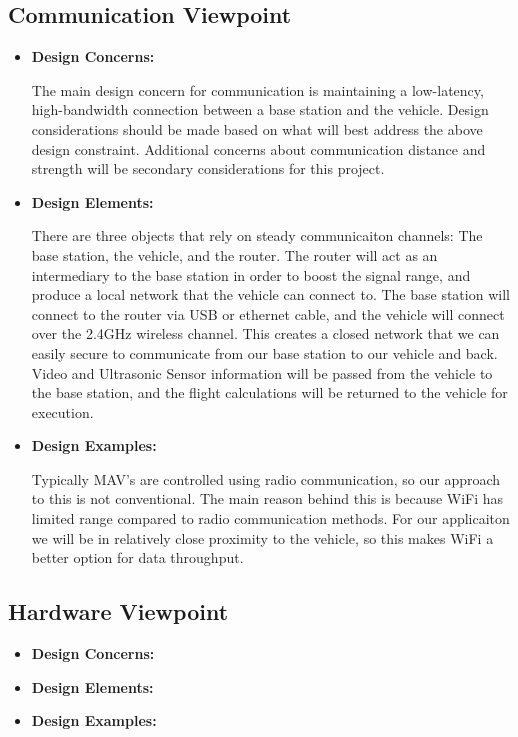 \documentclass[onecolumn, draftclsnofoot,10pt, compsoc]{IEEEtran}
\begin{document}
    

\subsection{Communication Viewpoint} 
\begin{itemize}
 \item{ \textbf{Design Concerns:}}

The main design concern for communication is maintaining a low-latency, high-bandwidth connection between a base station and the vehicle. Design considerations should be made based on what will best address the above design constraint. Additional concerns about communication distance and strength will be secondary considerations for this project. \\ 

\item{ \textbf{Design Elements:}}

There are three objects that rely on steady communicaiton channels: The base station, the vehicle, and the router. The router will act as an intermediary to the base station in order to boost the signal range, and produce a local network that the vehicle can connect to. The base station will connect to the router via USB or ethernet cable, and the vehicle will connect over the 2.4GHz wireless channel. This creates a closed network that we can easily secure to communicate from our base station to our vehicle and back. Video and Ultrasonic Sensor information will be passed from the vehicle to the base station, and the flight calculations will be returned to the vehicle for execution. \\

\item{ \textbf{Design Examples:}}

Typically MAV's are controlled using radio communication, so our approach to this is not conventional. The main reason behind this is because WiFi has limited range compared to radio communication methods. For our applicaiton we will be in relatively close proximity to the vehicle, so this makes WiFi a better option for data throughput. \\


\end{itemize}



\subsection{Hardware Viewpoint} 
\begin{itemize}
\item{ \textbf{Design Concerns:}}

\item{ \textbf{Design Elements:}}

\item{ \textbf{Design Examples:}} %

\end{itemize}
\end{document}
